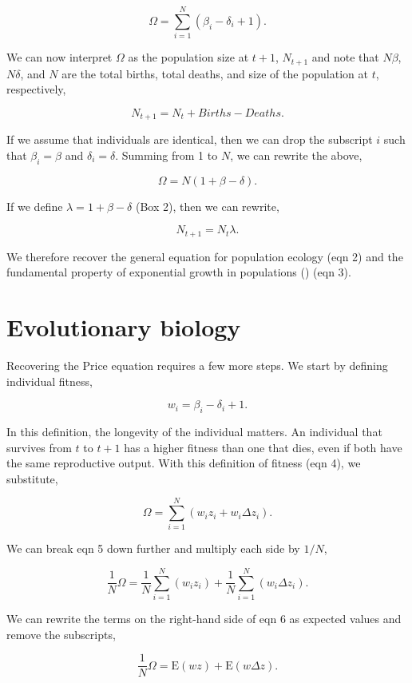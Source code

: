 \documentclass[
]{article}
\begin{document}
\[\Omega = \sum_{i=1}^{N} \left(\beta_{i} - \delta_{i} + 1 \right).\]

We can now interpret \(\Omega\) as the population size at \(t+1\),
\(N_{t+1}\) and note that \(N\beta\), \(N\delta\), and \(N\) are the
total births, total deaths, and size of the population at \(t\),
respectively,

\[N_{t+1} = N_{t} + Births - Deaths.
\tag{2}
\]

If we assume that individuals are identical, then we can drop the
subscript \(i\) such that \(\beta_{i} = \beta\) and
\(\delta_{i} = \delta\). Summing from 1 to \(N\), we can rewrite the
above,

\[\Omega = N\left(1 + \beta - \delta \right).\]

If we define \(\lambda = 1 + \beta - \delta\) (Box 2), then we can
rewrite,

\[N_{t+1} = N_{t}\lambda.
\tag{3}
\]

We therefore recover the general equation for population ecology (eqn 2)
and the fundamental property of exponential growth in populations
() (eqn 3).

\section{Evolutionary biology}\label{evolutionary-biology}

Recovering the Price equation requires a few more steps. We start by
defining individual fitness,

\[w_{i} = \beta_{i} - \delta_{i} + 1.
\tag{4}
\]

In this definition, the longevity of the individual matters. An
individual that survives from \(t\) to \(t + 1\) has a higher fitness
than one that dies, even if both have the same reproductive output. With
this definition of fitness (eqn 4), we substitute,

\[\Omega = \sum_{i=1}^{N} \left(w_{i}z_{i} + w_{i}\Delta z_{i} \right).
\tag{5}
\]

We can break eqn 5 down further and multiply each side by \(1/N\),

\[\frac{1}{N}\Omega = \frac{1}{N}\sum_{i=1}^{N} \left(w_{i}z_{i} \right) + \frac{1}{N}\sum_{i=1}^{N}\left( w_{i}\Delta z_{i} \right).
\tag{6}
\]

We can rewrite the terms on the right-hand side of eqn 6 as expected
values and remove the subscripts,

\[\frac{1}{N}\Omega = \mathrm{E}\left(w z \right) + \mathrm{E}\left( w \Delta z  \right).
\tag{7}
\]
\end{document}
